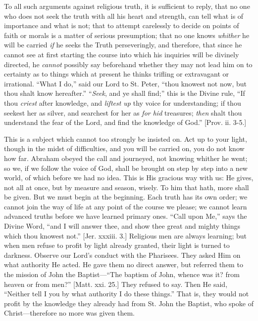 To all such arguments against religious truth, it is sufficient to
reply, that no one who does not seek the truth with all his heart and
strength, can tell what is of importance and what is not; that to
attempt carelessly to decide on points of faith or morals is a matter
of serious presumption; that no one knows \emph{whither} he will be
carried \emph{if} he seeks the Truth perseveringly, and therefore, that since
he cannot see at first starting the course into which his inquiries
will be divinely directed, he \emph{cannot} possibly say beforehand whether
they may not lead him on to certainty as to things which at present he
thinks trifling or extravagant or irrational. ``What I do,''
said our Lord to St. Peter, ``thou knowest not now, but thou shalt
know hereafter.'' ``\emph{Seek}, and ye shall find;'' this
is the Divine rule, ``If thou \emph{criest} after knowledge, and \emph{liftest
up} thy voice for understanding; if thou seekest her as silver, and
searchest for her as \emph{for hid} treasures; \emph{then} shalt thou
understand the fear of the Lord, and find the knowledge of God.''
[Prov. ii. 3-5.]

This is a subject which cannot too strongly be insisted on. Act up
to your light, though in the midst of difficulties, and you will be
carried on, you do not know how far. Abraham obeyed the call and
journeyed, not knowing whither he went; so we, if we follow the voice
of God, shall be brought on step by step into a new world, of which
before we had no idea. This is His gracious way with us: He gives, not
all at once, but by measure and season, wisely. To him that hath, more
shall be given. But we must begin at the beginning. Each truth has its
own order; we cannot join the way of life at any point of the course
we please; we cannot learn advanced truths before we have learned
primary ones. ``Call upon Me,'' says the Divine Word,
``and I will answer thee, and show thee great and mighty things
which thou knowest not.'' [Jer. xxxiii. 3.] Religious men are
always learning; but when men refuse to profit by light already
granted, their light is turned to darkness. Observe our Lord's conduct
with the Pharisees. They asked Him on what authority He acted. He gave
them no direct answer, but referred them to the mission of John the
Baptist—``The baptism of John, whence was it? from heaven or
from men?'' [Matt. xxi. 25.] They refused to say. Then He said,
``Neither tell I you by what authority I do these things.''
That is, they would not profit by the knowledge they already had from
St. John the Baptist, who spoke of Christ—therefore no more was
given them.

